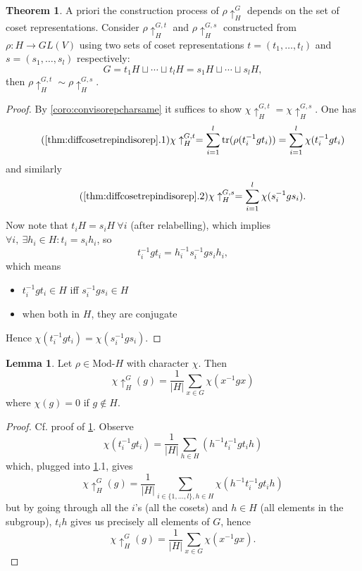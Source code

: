 \documentclass[a4paper]{article}
\newcommand{\tr}{\text{tr}}
\newcommand{\Mod}{\text{Mod-}}
\theoremstyle{definition}
\newtheorem{thm}[defn]{Theorem}
\newtheorem{lemma}[defn]{Lemma}
\begin{document}
\begin{thm}
\label{thm:diffcosetrepindisorep}
A priori the construction process of $\rho\uparrow_H^G$ depends on the set of coset representations. Consider $\rho\uparrow_H^{G,t}$ and $\rho\uparrow_H^{G,s}$ constructed from $\rho:H\rightarrow GL(V)$ using two sets of coset representations $t=(t_1,\ldots,t_l)$ and $s=(s_1,\ldots,s_l)$ respectively:
\[
G=t_1 H\sqcup\cdots\sqcup t_lH=s_1 H\sqcup\cdots\sqcup s_lH,
\]
then $\rho\uparrow_H^{G,t}\sim\rho\uparrow_H^{G,s}$.
\end{thm}
\begin{proof}
By \ref{coro:convisorepcharsame} it suffices to show $\chi\uparrow_H^{G,t}=\chi\uparrow_H^{G,s}$. One has
\[
\tag{\ref{thm:diffcosetrepindisorep}.1}
\chi\uparrow_H^{G,t}=\sum_{i=1}^l \tr(\rho(t_i^{-1}gt_i))=\sum_{i=1}^l \chi(t_i^{-1}gt_i)
\]
and similarly
\[
\tag{\ref{thm:diffcosetrepindisorep}.2}
\chi\uparrow_H^{G,s}=\sum_{i=1}^l \chi(s_i^{-1}gs_i).
\]
Now note that $t_iH=s_iH \ \forall i$ (after relabelling), which implies $\forall i,\ \exists h_i\in H:t_i=s_ih_i$, so
\[
t_i^{-1}gt_i=h_i^{-1}s_i^{-1}gs_ih_i,
\]
which means
\begin{itemize}
\item $t_i^{-1}gt_i\in H$ iff $s_i^{-1}gs_i\in H$
\item when both in $H$, they are conjugate
\end{itemize}
Hence $\chi(t_i^{-1}gt_i)=\chi(s_i^{-1}gs_i)$.
\end{proof}

\begin{lemma}
\label{lemma:formulaforcharofindrep}
Let $\rho\in\Mod H$ with character $\chi$. Then
\[
\chi\uparrow_H^G(g)=\frac{1}{|H|}\sum_{x\in G}\chi(x^{-1}gx)
\]
where $\chi(g)=0$ if $g\notin H$.
\end{lemma}
\begin{proof}
Cf. proof of \ref{thm:diffcosetrepindisorep}. Observe
\[
\chi(t_i^{-1}gt_i)=\frac{1}{|H|}\sum_{h\in H}(h^{-1}t_i^{-1}gt_ih)
\]
which, plugged into \ref{thm:diffcosetrepindisorep}.1, gives
\[
\chi\uparrow_H^G(g)=\frac{1}{|H|}\sum_{i\in\{1,\ldots,l\},h\in H}\chi(h^{-1}t_i^{-1}gt_ih)
\]
but by going through all the $i$'s (all the cosets) and $h\in H$ (all elements in the subgroup), $t_ih$ gives us precisely all elements of $G$, hence
\[
\chi\uparrow_H^G(g)=\frac{1}{|H|}\sum_{x\in G}\chi(x^{-1}gx).
\]
\end{proof}
\end{document}
